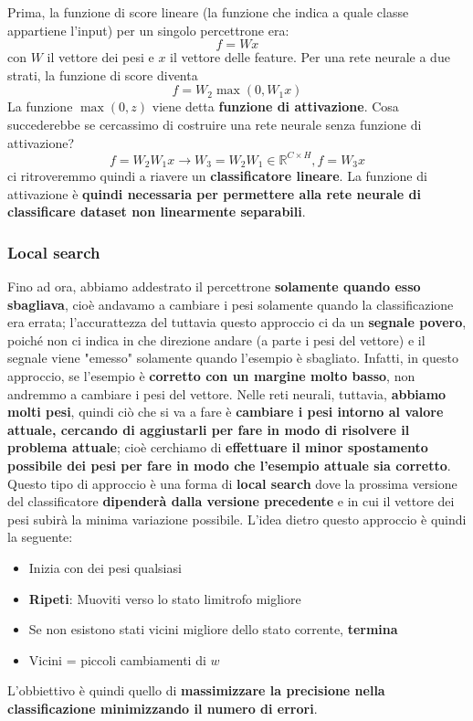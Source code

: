 \documentclass[12pt]{article}
\begin{document}
Prima, la funzione di score lineare (la funzione che indica a quale classe appartiene l'input) per un singolo percettrone era:
$$f = Wx$$
con $W$ il vettore dei pesi e $x$ il vettore delle feature. Per una rete neurale a due strati, la funzione di score diventa
$$f = W_2 \max(0, W_1x)$$
La funzione $\max(0, z)$ viene detta \textbf{funzione di attivazione}. Cosa succederebbe se cercassimo di costruire una rete neurale senza funzione di attivazione?
$$f = W_2W_1x \rightarrow W_3 = W_2W_1 \in \mathbb{R}^{C \times H}, f = W_3x$$
ci ritroveremmo quindi a riavere un \textbf{classificatore lineare}. La funzione di attivazione è \textbf{quindi necessaria per permettere alla rete neurale di classificare dataset non linearmente separabili}.
\subsubsection{Local search}
Fino ad ora, abbiamo addestrato il percettrone \textbf{solamente quando esso sbagliava}, cioè andavamo a cambiare i pesi solamente quando la classificazione era errata; l'accurattezza del tuttavia questo approccio ci da un \textbf{segnale povero}, poiché non ci indica in che direzione andare (a parte i pesi del vettore) e il segnale
viene "emesso" solamente quando l'esempio è sbagliato. Infatti, in questo approccio, se l'esempio è \textbf{corretto con un margine molto basso}, non andremmo a cambiare i pesi del vettore.
Nelle reti neurali, tuttavia, \textbf{abbiamo molti pesi}, quindi ciò che si va a fare è \textbf{cambiare i pesi intorno al valore attuale, cercando di aggiustarli per fare in modo di risolvere il problema attuale}; cioè cerchiamo di \textbf{effettuare il minor spostamento possibile dei pesi per fare in modo che l'esempio attuale sia corretto}.
Questo tipo di approccio è una forma di \textbf{local search} dove la prossima versione del classificatore \textbf{dipenderà dalla versione precedente} e in cui il vettore dei pesi subirà la minima variazione possibile.
L'idea dietro questo approccio è quindi la seguente:
\begin{itemize}
    \item Inizia con dei pesi qualsiasi
    \item \textbf{Ripeti}: Muoviti verso lo stato limitrofo migliore
    \item Se non esistono stati vicini migliore dello stato corrente, \textbf{termina}
    \item Vicini = piccoli cambiamenti di $w$
\end{itemize}
L'obbiettivo è quindi quello di \textbf{massimizzare la precisione nella classificazione minimizzando il numero di errori}.
\end{document}

